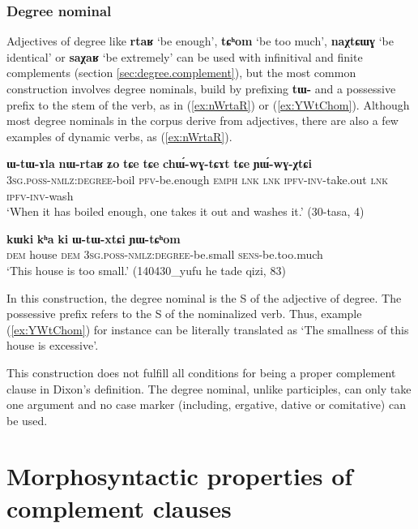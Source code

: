 \documentclass[oldfontcommands,oneside,a4paper,11pt]{article}
\newcommand{\ipa}[1]{\textbf{\phon#1}} %
\newcommand{\jpg}[2]{\ipa{#1} `#2'} %
\begin{document}
  \subsubsection{Degree nominal}  \label{sec:degree}
Adjectives of degree like \jpg{rtaʁ}{be enough}, \jpg{tɕʰom}{be too much}, \jpg{naχtɕɯɣ}{be identical} or \jpg{saχaʁ}{be extremely} can be used with infinitival and finite complements (section \ref{sec:degree.complement}), but the most common construction involves degree nominals, build by prefixing \ipa{tɯ-} and a possessive prefix to the stem of the verb, as in (\ref{ex:nWrtaR}) or (\ref{ex:YWtChom}). Although most degree nominals in the corpus derive from adjectives, there are also a few examples of dynamic verbs, as (\ref{ex:nWrtaR}).


\begin{exe}
\ex \label{ex:nWrtaR}
\gll \ipa{ɯ-tɯ-ɤla} 	\ipa{nɯ-rtaʁ} 	\ipa{ʑo} 	\ipa{tɕe} 	\ipa{tɕe} 	\ipa{chɯ́-wɣ-tɕɤt} 	\ipa{tɕe} 	\ipa{ɲɯ́-wɣ-χtɕi} \\
\textsc{3sg.poss-nmlz:degree}-boil \textsc{pfv}-be.enough \textsc{emph} \textsc{lnk} \textsc{lnk} \textsc{ipfv-inv}-take.out  \textsc{lnk} \textsc{ipfv-inv}-wash \\
\glt `When it has boiled enough, one takes it out and washes it.' (30-tasa, 4)
\end{exe}

\begin{exe}
\ex \label{ex:YWtChom}
\gll
\ipa{kɯki} 	\ipa{kʰa} 	\ipa{ki} 	\ipa{ɯ-tɯ-xtɕi} 	\ipa{ɲɯ-tɕʰom} \\
\textsc{dem} house \textsc{dem} \textsc{3sg.poss-nmlz:degree}-be.small \textsc{sens}-be.too.much \\
\glt `This house is too small.' (140430_yufu he tade qizi, 83)
\end{exe}

In this construction, the degree nominal is the S of the adjective of degree. The possessive prefix refers to the S of the nominalized verb. Thus, example (\ref{ex:YWtChom}) for instance can be literally translated as `The smallness of this house is excessive'. 

This construction does not fulfill all conditions for being a proper complement clause in Dixon's definition. The degree nominal, unlike participles, can only take one argument and no case marker (including, ergative, dative or comitative) can be used.


 
  \section{Morphosyntactic properties of complement clauses} 
\end{document}
